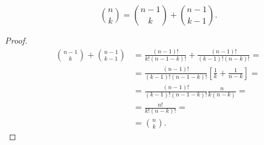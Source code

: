 \begin{theorem}\label{thm:pascals_identity}
  \begin{equation*}
    \binom n k = \binom {n - 1} k + \binom {n - 1} {k - 1}.
  \end{equation*}
\end{theorem}
\begin{proof}
  \begin{align*}
    \binom {n - 1} k + \binom {n - 1} {k - 1}
    &=
    \frac {(n - 1)!} {k! (n - 1 - k)!} + \frac {(n - 1)!} {(k - 1)! (n - k)!}
    = \\ &=
    \frac {(n - 1)!} {(k - 1)! (n - 1 - k)!} \left[ \frac 1 k + \frac 1 {n - k} \right]
    = \\ &=
    \frac {(n - 1)!} {(k - 1)! (n - 1 - k)!} \frac n {k(n - k)}
    = \\ &=
    \frac {n!} {k! (n - k)!}
    = \\ &=
    \binom n k.
  \end{align*}
\end{proof}
